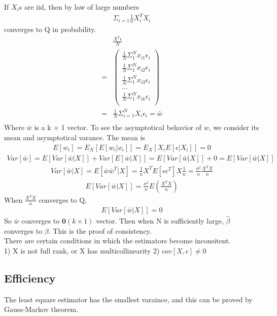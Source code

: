 \documentclass[a4paper]{article}
\begin{document}
If $X_i$s are iid, then by law of large numbers
\begin{align*}
\Sigma_{i=1}  \frac{1}{n}{X_i^TX_i} 
\end{align*}
converges to Q in probability.\\
\begin{align*}
&\frac{X^T \epsilon}{N}\\ 
 =& \left(\begin{array} {c}
       \frac{1}{N}\Sigma_{1}^{N}x_{i1}\epsilon_i \\
       \frac{1}{N}\Sigma_{1}^{N}x_{i2}\epsilon_i \\
       \frac{1}{N}\Sigma_{1}^{N}x_{i3}\epsilon_i \\
       ... \\ 
      \frac{1}{N}\Sigma_{1}^{N}x_{ik}\epsilon_i\\
     \end{array} \right)\\
=& \frac{1}{N}\Sigma_{i=1}^{N} X_i\epsilon_i = \bar w\\
\end{align*}
Where $\bar w$ is a k $\times$ 1 vector. To see the asymptotical behavior of $w$, we consider its mean and asymptotical varance. The mean is
\begin{align*}
E[w_i]=E_X[E[w_i|x_i]] = E_X[X_iE[\epsilon|X_i]] = 0
\end{align*}
\begin{align*}
Var[\bar w]=E[Var[\bar w|X]]+Var[E[\bar w|X]] = E[Var[\bar w|X]]+0 = E[Var[\bar w|X]]
\end{align*}
\begin{align*}
Var[\bar w|X] = E[\bar w \bar w^T|X]=\frac{1}{n}X^TE[\epsilon \epsilon^T]X\frac{1}{n} = \frac{\sigma^2}{n}\frac{X^T X}{n}
\end{align*}
\begin{align*}
E[Var[\bar w|X]] = \frac{\sigma^2}{n}E(\frac{X^TX}{n})
\end{align*}
When $\frac{X^TX}{n}$ converges to Q, 
\begin{align*}
E[Var[\bar w|X]] = 0
\end{align*} 
So $\bar w$ converges to $\boldsymbol 0(k \times 1)$ vector. Then when N is sufficiently large, $\hat \beta$ converges to $\beta$. This is the proof of consistency.\\
There are certain conditions in which the estimators become inconsitent.\\
1) X is not full rank, or X has multicollinearity
2) $cov[X, \epsilon] \neq 0$
\subsection{Efficiency}
The least equare estimator has the smallest varaince, and this can be proved by Gauss-Markov theorem. 
\end{document}
